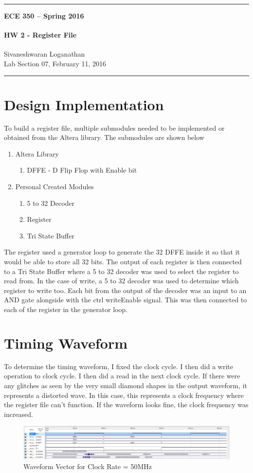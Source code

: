 \documentclass{article}
\begin{document}
\begin{center}
\rule{6.5in}{0.5mm}
{\bf \large ECE 350 -- Spring 2016}\\~\\
{\bf \huge HW 2 - Register File}\\~\\
Sivaneshwaran Loganathan\\
Lab Section 07, February 11, 2016\\
\rule{6.5in}{0.5mm}
\end{center}
\section{Design Implementation}
To build a register file, multiple submodules needed to be implemented or obtained from the Altera library. The submodules are shown below
\begin{enumerate}
	\item Altera Library
	\begin{enumerate}
		\item DFFE - D Flip Flop with Enable bit
	\end{enumerate}
	\item Personal Created Modules
	  \begin{enumerate}
	  	\item 5 to 32 Decoder
	  	\item Register
	  	\item Tri State Buffer
	  \end{enumerate}
\end{enumerate}
The register used a generator loop to generate the 32 DFFE inside it so that it would be able to store all 32 bits. The output of each register is then connected to a Tri State Buffer where a 5 to 32 decoder was used to select the register to read from. In the case of write, a 5 to 32 decoder was used to determine which register to write too. Each bit from the output of the decoder was an input to an AND gate alongside with the ctrl writeEnable signal. This was then connected to each of the register in the generator loop.
\section{Timing Waveform}
To determine the timing waveform, I fixed the clock cycle. I then did a write operation to  clock cycle. I then did a read in the next clock cycle. If there were any glitches as seen by the very small diamond shapes in the output waveform, it represents a distorted wave. In this case, this represents a clock frequency where the register file can't function. If the waveform looks fine, the clock frequency was increased.


\begin{figure}[ht!]
\begin{center}
\includegraphics[scale=0.4]{timingSim.JPG}
\caption{Waveform Vector for Clock Rate = 50MHz}
\end{center}
\end{figure}
\end{document}

